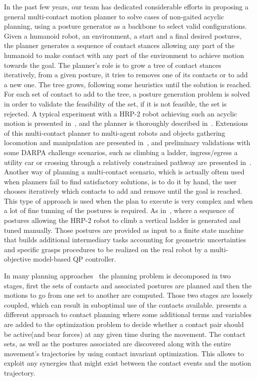 In the past few years, our team has dedicated considerable efforts in proposing a general multi-contact motion planner to solve cases of non-gaited acyclic planning, using a posture generator as a backbone to select valid configurations.
Given a humanoid robot, an environment, a start and a final desired postures, the planner generates a sequence of contact stances allowing any part of the humanoid to make contact with any part of the environment to achieve motion towards the goal.
The planner's role is to grow a tree of contact stances iteratively, from a given posture, it tries to removes one of its contacts or to add a new one.
The tree grows, following some heuristics until the solution is reached.
For each set of contact to add to the tree, a posture generation problem is solved in order to validate the feasibility of the set, if it is not feasible, the set is rejected.
A typical experiment with a HRP-2 robot achieving such an acyclic motion is presented in~\cite{escande:iser:2008}, and the planner is thoroughly described in~\cite{escande:ras:2013}.
Extensions of this multi-contact planner to multi-agent robots and objects gathering locomotion and manipulation are presented in~\cite{bouyarmane:ar:2012}, and preliminary validations with some DARPA challenge scenarios, such as climbing a ladder, ingress/egress a utility car or crossing through a relatively constrained pathway are presented in~\cite{bouyarmane:humanoids:2012}.
Another way of planning a multi-contact scenario, which is actually oftem used when planners fail to find satisfactory solutions, is to do it by hand, the user chooses iteratively which contacts to add and remove until the goal is reached.
This type of approach is used when the plan to execute is very complex and when a lot of fine tunning of the postures is required.
As in~\cite{vaillant:autonomousrobots:2016}, where a sequence of postures allowing the HRP-2 robot to climb a vertical ladder is generated and tuned manually.
Those postures are provided as input to a finite state machine that builds additional intermediary tasks accounting for geometric uncertainties and specific grasps procedures to be realized on the real robot by a multi-objective model-based QP controller.

In many planning approaches~\cite{kuffner2005motion, chestnutt2007navigation, hauser:ijrr:2008, kolter2008control, bouyarmane:icra:2011} the planning problem is decomposed in two stages, first the sets of contacts and associated postures are planned and then the motions to go from one set to another are computed.
Those two stages are loosely coupled, which can result in suboptimal use of the contacts available.
\cite{mordatch:acm:2012} presents a different approach to contact planning where some additional terms and variables are added to the optimization problem to decide whether a contact pair should be active(and bear forces) at any given time during the movement.
The contact sets, as well as the postures associated are discovered along with the entire movement's trajectories by using contact invariant optimization.
This allows to exploit any synergies that might exist between the contact events and the motion trajectory.

